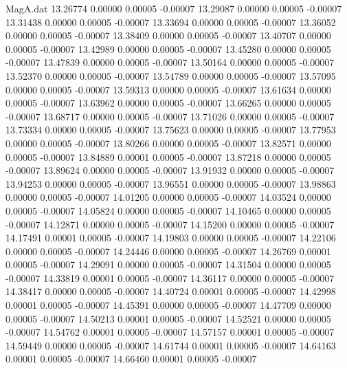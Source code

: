 \begin{filecontents}{MagA.dat}
  13.26774    0.00000    0.00005   -0.00007
  13.29087    0.00000    0.00005   -0.00007
  13.31438    0.00000    0.00005   -0.00007
  13.33694    0.00000    0.00005   -0.00007
  13.36052    0.00000    0.00005   -0.00007
  13.38409    0.00000    0.00005   -0.00007
  13.40707    0.00000    0.00005   -0.00007
  13.42989    0.00000    0.00005   -0.00007
  13.45280    0.00000    0.00005   -0.00007
  13.47839    0.00000    0.00005   -0.00007
  13.50164    0.00000    0.00005   -0.00007
  13.52370    0.00000    0.00005   -0.00007
  13.54789    0.00000    0.00005   -0.00007
  13.57095    0.00000    0.00005   -0.00007
  13.59313    0.00000    0.00005   -0.00007
  13.61634    0.00000    0.00005   -0.00007
  13.63962    0.00000    0.00005   -0.00007
  13.66265    0.00000    0.00005   -0.00007
  13.68717    0.00000    0.00005   -0.00007
  13.71026    0.00000    0.00005   -0.00007
  13.73334    0.00000    0.00005   -0.00007
  13.75623    0.00000    0.00005   -0.00007
  13.77953    0.00000    0.00005   -0.00007
  13.80266    0.00000    0.00005   -0.00007
  13.82571    0.00000    0.00005   -0.00007
  13.84889    0.00001    0.00005   -0.00007
  13.87218    0.00000    0.00005   -0.00007
  13.89624    0.00000    0.00005   -0.00007
  13.91932    0.00000    0.00005   -0.00007
  13.94253    0.00000    0.00005   -0.00007
  13.96551    0.00000    0.00005   -0.00007
  13.98863    0.00000    0.00005   -0.00007
  14.01205    0.00000    0.00005   -0.00007
  14.03524    0.00000    0.00005   -0.00007
  14.05824    0.00000    0.00005   -0.00007
  14.10465    0.00000    0.00005   -0.00007
  14.12871    0.00000    0.00005   -0.00007
  14.15200    0.00000    0.00005   -0.00007
  14.17491    0.00001    0.00005   -0.00007
  14.19803    0.00000    0.00005   -0.00007
  14.22106    0.00000    0.00005   -0.00007
  14.24446    0.00000    0.00005   -0.00007
  14.26769    0.00001    0.00005   -0.00007
  14.29091    0.00000    0.00005   -0.00007
  14.31504    0.00000    0.00005   -0.00007
  14.33819    0.00001    0.00005   -0.00007
  14.36117    0.00000    0.00005   -0.00007
  14.38417    0.00000    0.00005   -0.00007
  14.40724    0.00001    0.00005   -0.00007
  14.42998    0.00001    0.00005   -0.00007
  14.45391    0.00000    0.00005   -0.00007
  14.47709    0.00000    0.00005   -0.00007
  14.50213    0.00001    0.00005   -0.00007
  14.52521    0.00000    0.00005   -0.00007
  14.54762    0.00001    0.00005   -0.00007
  14.57157    0.00001    0.00005   -0.00007
  14.59449    0.00000    0.00005   -0.00007
  14.61744    0.00001    0.00005   -0.00007
  14.64163    0.00001    0.00005   -0.00007
  14.66460    0.00001    0.00005   -0.00007

\end{filecontents}
